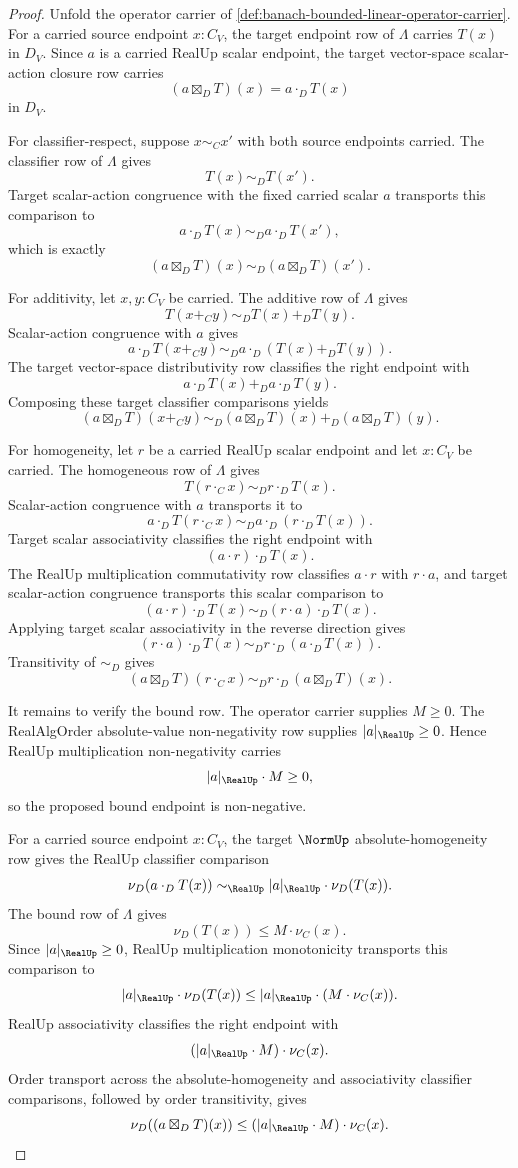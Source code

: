 \begin{proof}
Unfold the operator carrier of \autoref{def:banach-bounded-linear-operator-carrier}. For a carried source endpoint $x:C_V$, the target endpoint row of $\Lambda$ carries $T(x)$ in $D_V$. Since $a$ is a carried RealUp scalar endpoint, the target vector-space scalar-action closure row carries
$$
(a\boxtimes_D T)(x)=a\cdot_D T(x)
$$
in $D_V$.

For classifier-respect, suppose $x\sim_Cx'$ with both source endpoints carried. The classifier row of $\Lambda$ gives
$$
T(x)\sim_D T(x').
$$
Target scalar-action congruence with the fixed carried scalar $a$ transports this comparison to
$$
a\cdot_DT(x)\sim_D a\cdot_DT(x'),
$$
which is exactly
$$
(a\boxtimes_D T)(x)\sim_D(a\boxtimes_D T)(x').
$$

For additivity, let $x,y:C_V$ be carried. The additive row of $\Lambda$ gives
$$
T(x+_C y)\sim_D T(x)+_D T(y).
$$
Scalar-action congruence with $a$ gives
$$
a\cdot_D T(x+_C y)\sim_D a\cdot_D(T(x)+_D T(y)).
$$
The target vector-space distributivity row classifies the right endpoint with
$$
a\cdot_D T(x)+_D a\cdot_D T(y).
$$
Composing these target classifier comparisons yields
$$
(a\boxtimes_D T)(x+_C y)
\sim_D
(a\boxtimes_D T)(x)+_D(a\boxtimes_D T)(y).
$$

For homogeneity, let $r$ be a carried RealUp scalar endpoint and let $x:C_V$ be carried. The homogeneous row of $\Lambda$ gives
$$
T(r\cdot_C x)\sim_D r\cdot_D T(x).
$$
Scalar-action congruence with $a$ transports it to
$$
a\cdot_D T(r\cdot_C x)\sim_D a\cdot_D(r\cdot_D T(x)).
$$
Target scalar associativity classifies the right endpoint with
$$
(a\cdot r)\cdot_D T(x).
$$
The RealUp multiplication commutativity row classifies $a\cdot r$ with $r\cdot a$, and target scalar-action congruence transports this scalar comparison to
$$
(a\cdot r)\cdot_D T(x)\sim_D(r\cdot a)\cdot_D T(x).
$$
Applying target scalar associativity in the reverse direction gives
$$
(r\cdot a)\cdot_D T(x)\sim_D r\cdot_D(a\cdot_D T(x)).
$$
Transitivity of $\sim_D$ gives
$$
(a\boxtimes_D T)(r\cdot_C x)
\sim_D
r\cdot_D(a\boxtimes_D T)(x).
$$

It remains to verify the bound row. The operator carrier supplies $M\ge0$. The RealAlgOrder absolute-value non-negativity row supplies $|a|_{\RealUp}\ge0$. Hence RealUp multiplication non-negativity carries
$$
|a|_{\RealUp}\cdot M\ge0,
$$
so the proposed bound endpoint is non-negative.

For a carried source endpoint $x:C_V$, the target $\NormUp$ absolute-homogeneity row gives the RealUp classifier comparison
$$
\nu_D(a\cdot_D T(x))\sim_{\RealUp}|a|_{\RealUp}\cdot\nu_D(T(x)).
$$
The bound row of $\Lambda$ gives
$$
\nu_D(T(x))\le M\cdot\nu_C(x).
$$
Since $|a|_{\RealUp}\ge0$, RealUp multiplication monotonicity transports this comparison to
$$
|a|_{\RealUp}\cdot\nu_D(T(x))
\le
|a|_{\RealUp}\cdot(M\cdot\nu_C(x)).
$$
RealUp associativity classifies the right endpoint with
$$
(|a|_{\RealUp}\cdot M)\cdot\nu_C(x).
$$
Order transport across the absolute-homogeneity and associativity classifier comparisons, followed by order transitivity, gives
$$
\nu_D((a\boxtimes_D T)(x))\le (|a|_{\RealUp}\cdot M)\cdot\nu_C(x).
$$


\end{proof}
